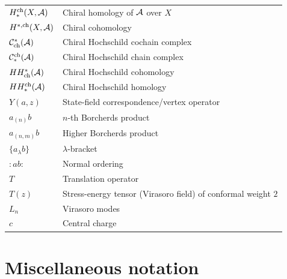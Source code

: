 \begin{longtable}{p{3cm} p{10cm}}
$H^{\mathrm{ch}}_*(X, \mathcal{A})$ & Chiral homology of $\mathcal{A}$ over $X$ \\
$H^{*,\mathrm{ch}}(X, \mathcal{A})$ & Chiral cohomology \\
$\mathcal{C}^*_{\mathrm{ch}}(\mathcal{A})$ & Chiral Hochschild cochain complex \\
$\mathcal{C}_*^{\mathrm{ch}}(\mathcal{A})$ & Chiral Hochschild chain complex \\
$HH^*_{\mathrm{ch}}(\mathcal{A})$ & Chiral Hochschild cohomology \\
$HH_*^{\mathrm{ch}}(\mathcal{A})$ & Chiral Hochschild homology \\
$Y(a, z)$ & State-field correspondence/vertex operator \\
$a_{(n)} b$ & $n$-th Borcherds product \\
$a_{(n,m)} b$ & Higher Borcherds product \\
$\{a_\lambda b\}$ & $\lambda$-bracket \\
$: ab :$ & Normal ordering \\
$T$ & Translation operator \\
$T(z)$ & Stress-energy tensor (Virasoro field) of conformal weight $2$ \\
$L_n$ & Virasoro modes \\
$c$ & Central charge \\
\end{longtable}


\section{Miscellaneous notation}
\label{sec:notation-misc}

